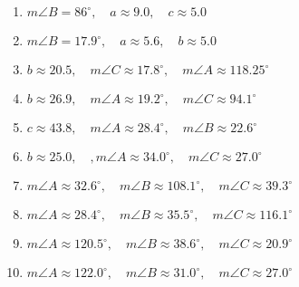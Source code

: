 \documentclass[11pt,a4paper]{article}
\begin{document}
\begin{enumerate}
    \item $m\angle B = 86^\circ, \quad a \approx 9.0, \quad c \approx 5.0$
    
    \item $m\angle B = 17.9^\circ, \quad a \approx 5.6, \quad b \approx 5.0$
    
    \item $b \approx 20.5, \quad m\angle C \approx 17.8^\circ, \quad m\angle A \approx 118.25^\circ$
    
    \item $b \approx 26.9, \quad m\angle A \approx 19.2^\circ, \quad m\angle C \approx 94.1^\circ$
    
    \item $c \approx 43.8, \quad m\angle A \approx 28.4^\circ, \quad m\angle B \approx 22.6^\circ$
    
    \item $b \approx 25.0, \quad, m\angle A \approx 34.0^\circ, \quad m\angle C \approx 27.0^\circ$
    
    \item $m\angle A \approx 32.6^\circ, \quad m\angle B \approx 108.1^\circ, \quad m\angle C \approx 39.3^\circ$
    
    \item $m\angle A \approx 28.4^\circ, \quad m\angle B \approx 35.5^\circ, \quad m\angle C \approx 116.1^\circ$
    
    \item $m\angle A \approx 120.5^\circ, \quad m\angle B \approx 38.6^\circ, \quad m\angle C \approx 20.9^\circ$
    
    \item $m\angle A \approx 122.0^\circ, \quad m\angle B \approx 31.0^\circ, \quad m\angle C \approx 27.0^\circ$
\end{enumerate}
\end{document}
